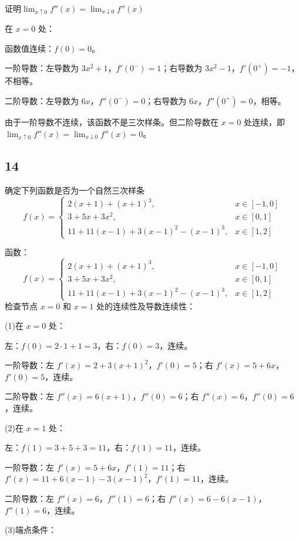 \documentclass{article}
\begin{document}
证明$\lim_{x\uparrow 0}f''(x)=\lim_{x\downarrow 0}f''(x)$

在 \(x = 0\) 处：

函数值连续：\(f(0) = 0\)。

一阶导数：左导数为 \(3x^2 + 1\)，\(f'(0^-) = 1\)；右导数为 \(3x^2 - 1\)，\(f'(0^+) = -1\)，不相等。

二阶导数：左导数为 \(6x\)，\(f''(0^-) = 0\)；右导数为 \(6x\)，\(f''(0^+) = 0\)，相等。

由于一阶导数不连续，该函数不是三次样条。但二阶导数在 \(x = 0\) 处连续，即 \(\lim_{x \uparrow 0} f''(x) = \lim_{x \downarrow 0} f''(x) = 0\)。

\subsection*{14}
确定下列函数是否为一个自然三次样条
\[
f(x)=\begin{cases}
2(x+1)+(x+1)^3, & x\in[-1,0] \\[2pt]
3+5x+3x^2, & x\in[0,1] \\[2pt]
11+11(x-1)+3(x-1)^2-(x-1)^3, & x\in[1,2]
\end{cases}
\]

函数：
\[
f(x) = \begin{cases}
2(x+1) + (x+1)^3, & x \in [-1, 0] \\
3 + 5x + 3x^2, & x \in [0, 1] \\
11 + 11(x-1) + 3(x-1)^2 - (x-1)^3, & x \in [1, 2]
\end{cases}
\]
检查节点 \(x = 0\) 和 \(x = 1\) 处的连续性及导数连续性：

(1)在 \(x = 0\) 处：

左：\(f(0) = 2 \cdot 1 + 1 = 3\)，右：\(f(0) = 3\)，连续。

一阶导数：左 \(f'(x) = 2 + 3(x+1)^2\)，\(f'(0) = 5\)；右 \(f'(x) = 5 + 6x\)，\(f'(0) = 5\)，连续。

二阶导数：左 \(f''(x) = 6(x+1)\)，\(f''(0) = 6\)；右 \(f''(x) = 6\)，\(f''(0) = 6\)，连续。

(2)在 \(x = 1\) 处：

左：\(f(1) = 3 + 5 + 3 = 11\)，右：\(f(1) = 11\)，连续。

一阶导数：左 \(f'(x) = 5 + 6x\)，\(f'(1) = 11\)；右 \(f'(x) = 11 + 6(x-1) - 3(x-1)^2\)，\(f'(1) = 11\)，连续。

二阶导数：左 \(f''(x) = 6\)，\(f''(1) = 6\)；右 \(f''(x) = 6 - 6(x-1)\)，\(f''(1) = 6\)，连续。

(3)端点条件：
\end{document}
